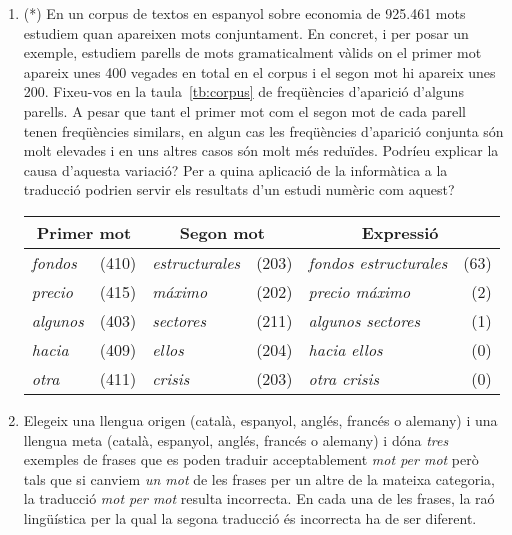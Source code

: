 \begin{enumerate}
\item (*) En un corpus de textos en espanyol sobre economia de 925.461
  mots estudiem quan apareixen mots conjuntament. En concret, i per
  posar un exemple, estudiem parells de mots gramaticalment vàlids on
  el primer mot apareix unes 400 vegades en total en el corpus i el
  segon mot hi apareix unes 200.  Fixeu-vos en la
  taula~\ref{tb:corpus} de freqüències d'aparició d'alguns parells. A
  pesar que tant el primer mot com el segon mot de cada parell tenen
  freqüències similars, en algun cas les freqüències d'aparició
  conjunta són molt elevades i en uns altres casos són molt més
  reduïdes.  Podríeu explicar la causa d'aquesta variació? Per a quina
  aplicació de la informàtica a la traducció podrien servir els
  resultats d'un estudi numèric com aquest?
  \begin{table*}
  \begin{center}
  \begin{tabular}{lr|lr|lr}
  \hline\hline
  \multicolumn{2}{c|}{\textsf{Primer mot}} &
  \multicolumn{2}{c|}{\textsf{Segon mot}} & 
  \multicolumn{2}{c}{\textsf{Expressió}}
   \\
  \hline
  \emph{fondos} & (410) & \emph{estructurales} & (203) & \emph{fondos
  estructurales} & (63) \\
  \emph{precio} & (415) & \emph{máximo} & (202) & \emph{precio máximo}
  & (2) \\
  \emph{algunos} & (403) & \emph{sectores} & (211) & \emph{algunos
  sectores} & (1) \\
  \emph{hacia} & (409) & \emph{ellos} & (204) & \emph{hacia ellos} &
  (0) \\
  \emph{otra} & (411) & \emph{crisis} & (203) & \emph{otra crisis} &
  (0) \\
  \hline
  \end{tabular}
  \end{center}
  \caption{Freqüències d'aparició de parells de mots sobre economia.}
  \label{tb:corpus}
  \end{table*}

\item Elegeix una llengua origen (català, espanyol, anglés, francés o
  alemany) i una llengua meta (català, espanyol, anglés, francés o
  alemany) i dóna \emph{tres} exemples de frases que es poden traduir
  acceptablement \emph{mot per mot} però tals que si canviem \emph{un
    mot} de les frases per un altre de la mateixa categoria, la
  traducció \emph{mot per mot} resulta incorrecta. En cada una de les
  frases, la raó lingüística per la qual la segona traducció és
  incorrecta ha de ser diferent.


\end{enumerate}
